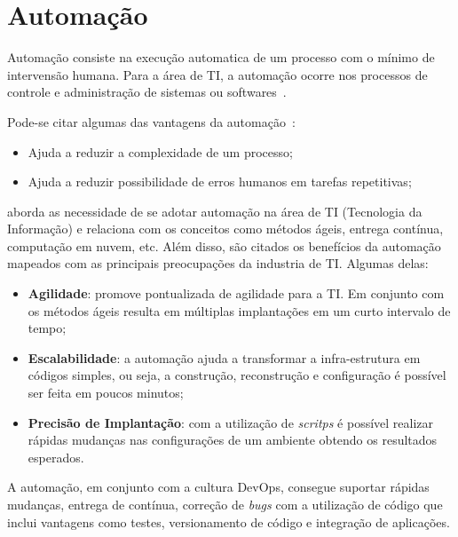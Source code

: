 \section{Automação}
\label{sec:auto}

Automação consiste na execução automatica de um processo com o mínimo de
intervensão humana. Para a área de TI, a automação ocorre nos processos de
controle e administração de sistemas ou softwares~\cite{sharma:2015}.

Pode-se citar algumas das vantagens da automação~\cite{sharma:2015}:
\begin{itemize}
  \item Ajuda a reduzir a complexidade de um processo;
  \item Ajuda a reduzir possibilidade de erros humanos em tarefas
    repetitivas;
\end{itemize}

 aborda as necessidade de se adotar automação na área
de TI (Tecnologia da Informação) e relaciona com os conceitos como métodos
ágeis, entrega contínua, computação em nuvem, etc. Além disso, são citados
os benefícios da automação mapeados com as principais preocupações da industria
de TI. Algumas delas:
\begin{itemize}
  \item \textbf{Agilidade}: promove pontualizada de agilidade para a TI. Em conjunto
    com os métodos ágeis resulta em múltiplas implantações em um curto intervalo
    de tempo;
  \item \textbf{Escalabilidade}: a automação ajuda a transformar a infra-estrutura
    em códigos simples, ou seja, a construção, reconstrução e configuração é possível
    ser feita em poucos minutos;
  \item \textbf{Precisão de Implantação}: com a utilização de \textit{scritps}
    é possível realizar rápidas mudanças nas configurações de um ambiente
    obtendo os resultados esperados.
\end{itemize}

A automação, em conjunto com a cultura DevOps, consegue suportar rápidas mudanças,
entrega de contínua, correção de \textit{bugs} com a utilização de código que inclui
vantagens como testes, versionamento de código e integração de aplicações.


